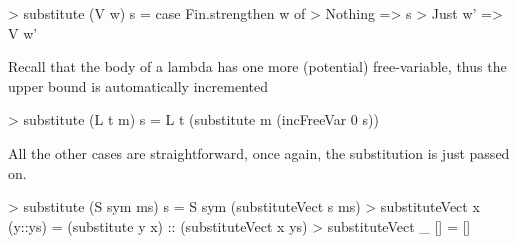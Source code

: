 > substitute (V w) s =  case Fin.strengthen w of
>                         Nothing => s
>                         Just w' => V w'

Recall that the body of a lambda has one more (potential) free-variable, thus the upper bound is
automatically incremented

> substitute (L t m) s = L t (substitute m (incFreeVar 0 s))

All the other cases are straightforward, once again, the substitution is just passed on.

> substitute (S sym ms) s = S sym (substituteVect s ms)
> substituteVect x (y::ys) = (substitute y x) :: (substituteVect x ys)
> substituteVect _ [] = []
